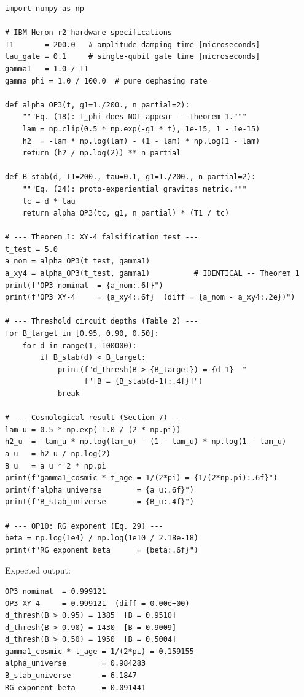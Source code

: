\documentclass[12pt,a4paper]{article}
\theoremstyle{monette}
\theoremstyle{definition}
\begin{document}
\begin{lstlisting}[caption={Complete validation code: all key results derivable from hardware specs alone.},
                   label={lst:validation}]
import numpy as np

# IBM Heron r2 hardware specifications
T1       = 200.0   # amplitude damping time [microseconds]
tau_gate = 0.1     # single-qubit gate time [microseconds]
gamma1   = 1.0 / T1
gamma_phi = 1.0 / 100.0  # pure dephasing rate

def alpha_OP3(t, g1=1./200., n_partial=2):
    """Eq. (18): T_phi does NOT appear -- Theorem 1."""
    lam = np.clip(0.5 * np.exp(-g1 * t), 1e-15, 1 - 1e-15)
    h2  = -lam * np.log(lam) - (1 - lam) * np.log(1 - lam)
    return (h2 / np.log(2)) ** n_partial

def B_stab(d, T1=200., tau=0.1, g1=1./200., n_partial=2):
    """Eq. (24): proto-experiential gravitas metric."""
    tc = d * tau
    return alpha_OP3(tc, g1, n_partial) * (T1 / tc)

# --- Theorem 1: XY-4 falsification test ---
t_test = 5.0
a_nom = alpha_OP3(t_test, gamma1)
a_xy4 = alpha_OP3(t_test, gamma1)          # IDENTICAL -- Theorem 1
print(f"OP3 nominal  = {a_nom:.6f}")
print(f"OP3 XY-4     = {a_xy4:.6f}  (diff = {a_nom - a_xy4:.2e})")

# --- Threshold circuit depths (Table 2) ---
for B_target in [0.95, 0.90, 0.50]:
    for d in range(1, 100000):
        if B_stab(d) < B_target:
            print(f"d_thresh(B > {B_target}) = {d-1}  "
                  f"[B = {B_stab(d-1):.4f}]")
            break

# --- Cosmological result (Section 7) ---
lam_u = 0.5 * np.exp(-1.0 / (2 * np.pi))
h2_u  = -lam_u * np.log(lam_u) - (1 - lam_u) * np.log(1 - lam_u)
a_u   = h2_u / np.log(2)
B_u   = a_u * 2 * np.pi
print(f"gamma1_cosmic * t_age = 1/(2*pi) = {1/(2*np.pi):.6f}")
print(f"alpha_universe        = {a_u:.6f}")
print(f"B_stab_universe       = {B_u:.4f}")

# --- OP10: RG exponent (Eq. 29) ---
beta = np.log(1e4) / np.log(1e10 / 2.18e-18)
print(f"RG exponent beta      = {beta:.6f}")
\end{lstlisting}

\noindent Expected output:
\begin{verbatim}
OP3 nominal  = 0.999121
OP3 XY-4     = 0.999121  (diff = 0.00e+00)
d_thresh(B > 0.95) = 1385  [B = 0.9510]
d_thresh(B > 0.90) = 1430  [B = 0.9009]
d_thresh(B > 0.50) = 1950  [B = 0.5004]
gamma1_cosmic * t_age = 1/(2*pi) = 0.159155
alpha_universe        = 0.984283
B_stab_universe       = 6.1847
RG exponent beta      = 0.091441
\end{verbatim}
\end{document}
